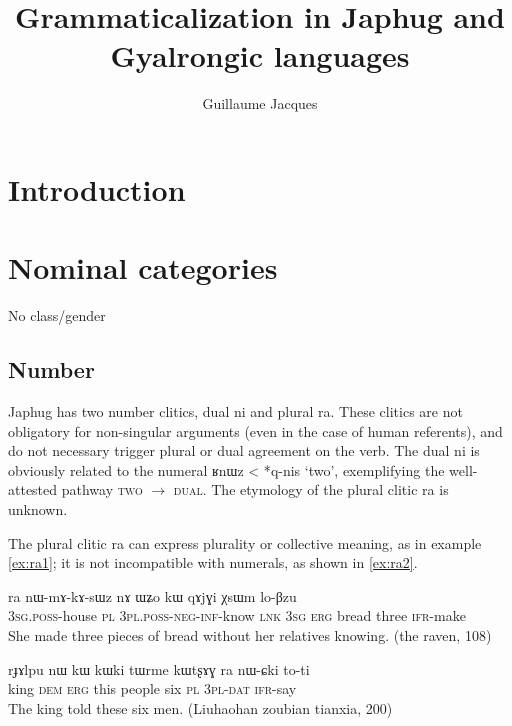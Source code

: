 \documentclass[oldfontcommands,oneside,a4paper,11pt]{article}
\newcommand{\ipa}[1]{{\phon #1}} %
\begin{document}
 
 \title{Grammaticalization in Japhug and Gyalrongic languages}
 \author{Guillaume Jacques}
 \maketitle  
 \section{Introduction}

 \section{Nominal categories} 
 
 No class/gender
\subsection{Number} 

Japhug has two number clitics, dual \ipa{ni} and plural \ipa{ra}. These clitics are not obligatory for non-singular arguments (even in the case of human referents), and do not necessary trigger plural or dual agreement on the verb. The dual \ipa{ni} is obviously related to the numeral \ipa{ʁnɯz} < *\ipa{q-nis} `two', exemplifying the well-attested pathway \textsc{two} $\rightarrow$ \textsc{dual}. The etymology of the plural clitic \ipa{ra} is unknown.
 
  The plural clitic \ipa{ra} can express plurality or collective meaning, as in example \ref{ex:ra1}; it is not incompatible with numerals, as shown in \ref{ex:ra2}.
 
\begin{exe}
\ex \label{ex:ra1}
\gll \ipa{ɯ-kha} 	\ipa{ra} 	\ipa{nɯ-mɤ-kɤ-sɯz} 	\ipa{nɤ} 	\ipa{ɯʑo} 	\ipa{kɯ} 	\ipa{qɤjɣi} 	\ipa{χsɯm} 	\ipa{lo-βzu} \\
\textsc{3sg.poss}-house \textsc{pl} \textsc{3pl.poss-neg-inf}-know \textsc{lnk} \textsc{3sg} \textsc{erg} bread three \textsc{ifr}-make \\
\glt She made three pieces of bread without her relatives knowing. (the raven, 108)
\end{exe}

\begin{exe}
\ex \label{ex:ra2}
\gll 
 \ipa{rɟɤlpu} 	\ipa{nɯ} 	\ipa{kɯ} 	\ipa{kɯki} 	\ipa{tɯrme} 	\ipa{kɯtʂɤɣ} 	\ipa{ra} 	\ipa{nɯ-ɕki}  	\ipa{to-ti} \\
 king \textsc{dem} \textsc{erg} this people six \textsc{pl} \textsc{3pl-dat} \textsc{ifr}-say  \\
 \glt The king told these six men. (Liuhaohan zoubian tianxia, 200)
\end{exe}
\end{document}
